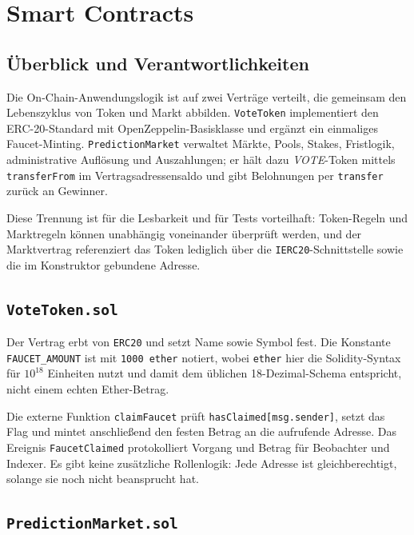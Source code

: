 \chapter{Smart Contracts}
\label{chap:contracts}

\section{Überblick und Verantwortlichkeiten}

Die On-Chain-Anwendungslogik ist auf zwei Verträge verteilt, die gemeinsam den
Lebenszyklus von Token und Markt abbilden. \texttt{VoteToken} implementiert den
ERC-20-Standard mit OpenZeppelin-Basisklasse und ergänzt ein einmaliges
Faucet-Minting. \texttt{PredictionMarket} verwaltet Märkte, Pools, Stakes,
Fristlogik, administrative Auflösung und Auszahlungen; er hält dazu
\emph{VOTE}-Token mittels \texttt{transferFrom} im Vertragsadressensaldo und
gibt Belohnungen per \texttt{transfer} zurück an Gewinner.

Diese Trennung ist für die Lesbarkeit und für Tests vorteilhaft: Token-Regeln
und Marktregeln können unabhängig voneinander überprüft werden, und der
Marktvertrag referenziert das Token lediglich über die \texttt{IERC20}-Schnittstelle
sowie die im Konstruktor gebundene Adresse.

\section{\texttt{VoteToken.sol}}

Der Vertrag erbt von \texttt{ERC20} und setzt Name sowie Symbol fest. Die
Konstante \texttt{FAUCET\_AMOUNT} ist mit \texttt{1000 ether} notiert, wobei
\texttt{ether} hier die Solidity-Syntax für $10^{18}$ Einheiten nutzt und damit
dem üblichen 18-Dezimal-Schema entspricht, nicht einem echten Ether-Betrag.

Die externe Funktion \texttt{claimFaucet} prüft \texttt{hasClaimed[msg.sender]},
setzt das Flag und mintet anschließend den festen Betrag an die aufrufende
Adresse. Das Ereignis \texttt{FaucetClaimed} protokolliert Vorgang und Betrag für
Beobachter und Indexer. Es gibt keine zusätzliche Rollenlogik: Jede Adresse ist
gleichberechtigt, solange sie noch nicht beansprucht hat.

\section{\texttt{PredictionMarket.sol}}

